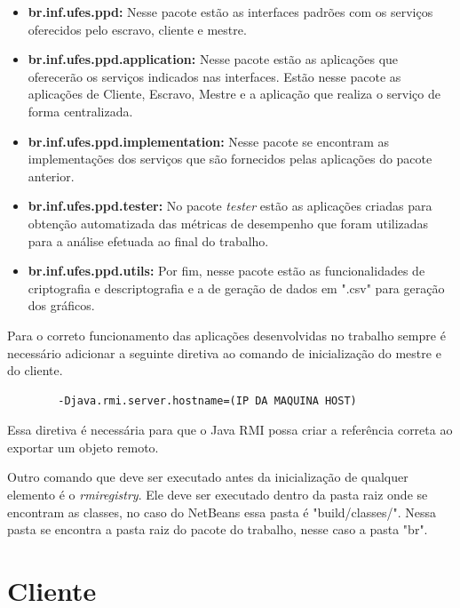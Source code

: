 \documentclass[
	12pt,				%
    oneside,			%
	a4paper,			%
	english,			%
	brazil,				%
	]{abntex2}
\begin{document}
\begin{itemize}

	\item \textbf{br.inf.ufes.ppd:} Nesse pacote estão as interfaces padrões com os serviços oferecidos pelo escravo,
	cliente e mestre.
	
	\item \textbf{br.inf.ufes.ppd.application:} Nesse pacote estão as aplicações que oferecerão os serviços indicados nas  
	interfaces. Estão nesse pacote as aplicações de Cliente, Escravo, Mestre e a aplicação que realiza o serviço de forma
	centralizada.

	\item \textbf{br.inf.ufes.ppd.implementation:} Nesse pacote se encontram as implementações dos serviços que são 
	fornecidos pelas aplicações do pacote anterior.
	
	\item \textbf{br.inf.ufes.ppd.tester:} No pacote \textit{tester} estão as aplicações criadas para obtenção automatizada
	das 	métricas de desempenho que foram utilizadas para a análise efetuada ao final do trabalho.
	
	\item \textbf{br.inf.ufes.ppd.utils:} Por fim, nesse pacote estão as funcionalidades de criptografia e descriptografia e 
	a de geração de dados em ".csv" para geração dos gráficos.
		

\end{itemize}

Para o correto funcionamento das aplicações desenvolvidas no trabalho sempre é necessário adicionar a seguinte diretiva ao comando de inicialização do mestre e do cliente.

\begin{center}
	\begin{lstlisting}
		-Djava.rmi.server.hostname=(IP DA MAQUINA HOST)\end{lstlisting}
\end{center}

Essa diretiva é necessária para que o Java RMI possa criar a referência correta ao exportar um objeto remoto. 

Outro comando que deve ser executado antes da inicialização de qualquer elemento é o \textit{rmiregistry}. Ele deve ser
executado dentro da pasta raiz onde se encontram as classes, no caso do NetBeans essa pasta é "build/classes/".
Nessa pasta se encontra a pasta raiz do pacote do trabalho, nesse caso a pasta "br".

\section{Cliente}
\end{document}
